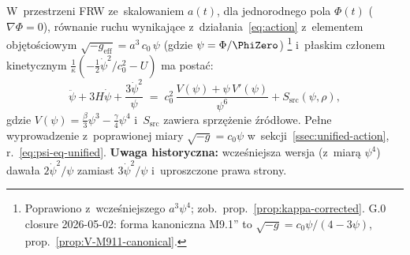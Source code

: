 \begin{proposition}%
\label{prop:FRW-derivation}
W~przestrzeni FRW ze~skalowaniem $a(t)$, dla jednorodnego pola
$\Phi(t)$ ($\nabla\Phi = 0$), r\'ownanie ruchu wynikaj\k{a}ce
z~dzia\l{}ania~\eqref{eq:action} z~elementem obj\k{e}to\'sciowym
$\sqrt{-g_{\mathrm{eff}}} = a^3\,c_0\,\psi$ (gdzie $\psi = \Phi/\PhiZero$)%
\footnote{Poprawiono z~wcze\'sniejszego $a^3\psi^4$;
  zob.\ prop.~\ref{prop:kappa-corrected}.
  G.0 closure 2026-05-02: forma kanoniczna M9.1''
  to $\sqrt{-g} = c_0\psi/(4-3\psi)$,
  prop.~\ref{prop:V-M911-canonical}.}
i~p\l{}askim cz\l{}onem kinetycznym $\frac{1}{\kappa}(-\frac{1}{2}\dot\psi^2/c_0^2 - U)$
ma posta\'c:
\begin{equation}\label{eq:Phi-cosmo-exact}
  \boxed{
    \ddot\psi + 3H\dot\psi + \frac{3\dot\psi^2}{\psi}
    \;=\; c_0^2\,\frac{V(\psi) + \psi\,V'(\psi)}{\psi^6}
    + S_{\mathrm{src}}(\psi,\rho),
  }
\end{equation}
gdzie $V(\psi) = \frac{\beta}{3}\psi^3 - \frac{\gamma}{4}\psi^4$
i~$S_{\mathrm{src}}$ zawiera sprz\k{e}\.zenie \'zr\'od\l{}owe.
Pe\l{}ne wyprowadzenie z~poprawionej miary $\sqrt{-g}=c_0\psi$
w~sekcji~\ref{ssec:unified-action},
r.~\eqref{eq:psi-eq-unified}.
\textbf{Uwaga historyczna:} wcze\'sniejsza wersja
(z~miar\k{a} $\psi^4$) dawa\l{}a
$2\dot\psi^2/\psi$ zamiast $3\dot\psi^2/\psi$
i~uproszczone prawa strony.
\end{proposition}

